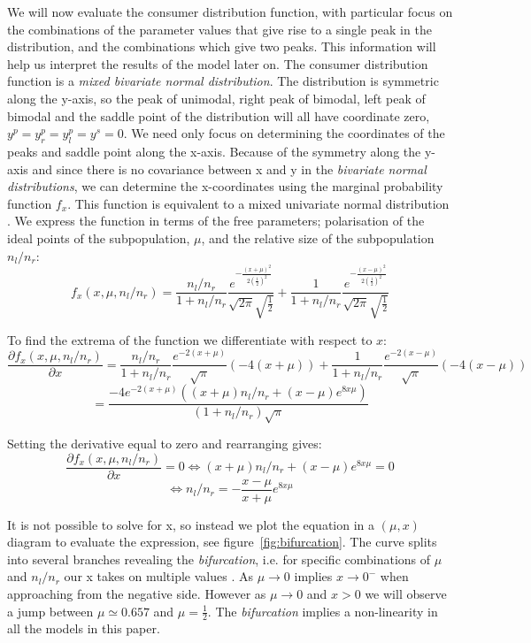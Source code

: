 \documentclass[preprint, 12pt]{elsarticle}
\begin{document}
We will now evaluate the consumer distribution function, with particular focus on the combinations of the parameter values that give rise to a single peak in the distribution, and the combinations which give two peaks. This information will help us interpret the results of the model later on. The consumer distribution function is a \emph{mixed bivariate normal distribution}. The distribution is symmetric along the y-axis, so the peak of unimodal, right peak of bimodal, left peak of bimodal and the saddle point of the distribution will all have coordinate zero, $y^p = y^p_r = y^p_l = y^s =0$. We need only focus on determining the coordinates of the peaks and saddle point along the x-axis. Because of the symmetry along the y-axis and since there is no covariance between x and y in the \emph{bivariate normal distributions}, we can determine the x-coordinates using the marginal probability function $f_x$. This function is equivalent to a mixed univariate normal distribution \citep{Weisstein_2002a, Weisstein_2002b, Balakrishnan_Lai_2009}. We express the function in terms of the free parameters; polarisation of the ideal points of the subpopulation, $\mu$, and the relative size of the subpopulation $n_l/n_r$:
\[
f_x(x,\mu,n_l/n_r) = \frac{n_l/n_r}{1+n_l/n_r} \frac{ e^{-\frac{(x+\mu)^2}{2\left(\frac{1}{2}\right)^2}}}{\sqrt{2\pi}\sqrt{\frac{1}{2}}} + \frac{1}{1+n_l/n_r} \frac{ e^{-\frac{(x-\mu)^2}{2\left(\frac{1}{2}\right)^2}}}{\sqrt{2\pi}\sqrt{\frac{1}{2}}}
\]

To find the extrema of the function we differentiate with respect to $x$:
\[
\frac{\partial f_x(x,\mu,n_l/n_r)}{{\partial x}} = \frac{n_l/n_r}{1+n_l/n_r} \frac{ e^{-2(x+\mu)}}{\sqrt{\pi}}\left(-4(x+\mu)\right) + \frac{1}{1+n_l/n_r} \frac{ e^{-2(x-\mu)}}{\sqrt{\pi}}\left(-4(x-\mu)\right)
\]
\[
= \frac{-4e^{-2(x+\mu)} \left((x+\mu)n_l/n_r + (x-\mu)e^{8x\mu} \right) }{(1+n_l/n_r)\sqrt{\pi}}
\]

Setting the derivative equal to zero and rearranging gives:
\[
\frac{\partial f_x(x,\mu,n_l/n_r)}{{\partial x}} = 0 \Leftrightarrow (x+\mu)n_l/n_r + (x-\mu)e^{8x\mu} = 0
\]
\begin{equation}
\Leftrightarrow n_l/n_r = - \frac{x-\mu}{x+\mu} e^{8x\mu}
\label{eq:extrema}
\end{equation}

It is not possible to solve for x, so instead we plot the equation in a $(\mu, x)$ diagram to evaluate the expression, see figure~\ref{fig:bifurcation}. The curve splits into several branches revealing the \emph{bifurcation}, i.e. for specific combinations of $\mu$ and $n_l/n_r$ our x takes on multiple values \citep{Strogatz_1994}. As $\mu \to 0$ implies $x \to 0^-$ when approaching from the negative side. However as $\mu \to 0$ and $x > 0$ we will observe a jump between $\mu \simeq 0.657$ and $\mu = \frac{1}{2}$. The \emph{bifurcation} implies a non-linearity in all the models in this paper.
\end{document}
